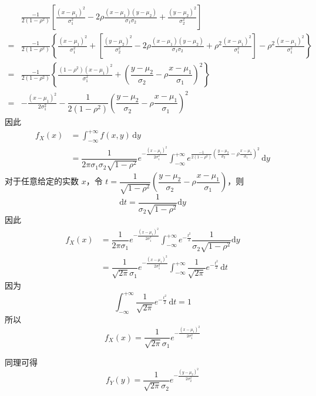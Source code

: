 \begin{myproof}
    $$
    \begin{aligned}
        & \frac{-1}{2(1-\rho^2)} \left[ \frac{(x-\mu_1)^2}{\sigma_1^2} - 2 \rho \frac{(x-\mu_1)(y-\mu_2)}{\sigma_1 \sigma_2} + \frac{(y-\mu_2)^2}{\sigma_2^2} \right] \\
        = & \frac{-1}{2(1-\rho^2)} \left\{ \frac{(x-\mu_1)^2}{\sigma_1^2} + \left[ \frac{(y-\mu_2)^2}{\sigma_2^2} - 2 \rho \frac{(x-\mu_1)(y-\mu_2)}{\sigma_1 \sigma_2} + \rho^2 \frac{(x-\mu_1)^2}{\sigma_1^2} \right] - \rho^2 \frac{(x-\mu_1)^2}{\sigma_1^2} \right\} \\
        = & \frac{-1}{2(1-\rho^2)} \left\{ \frac{(1-\rho^2)(x-\mu_1)^2}{\sigma_1^2} + \left( \dfrac{y-\mu_2}{\sigma_2} - \rho \dfrac{x-\mu_1}{\sigma_1} \right)^2 \right\} \\
        = & -\frac{(x-\mu_1)^2}{2\sigma_1^2} - \dfrac{1}{2(1-\rho^2)} \left( \dfrac{y-\mu_2}{\sigma_2} - \rho \dfrac{x-\mu_1}{\sigma_1} \right)^2
    \end{aligned}
    $$
    因此
    $$
    \begin{aligned}
        f_{X}(x) &= \int_{-\infty}^{+\infty} f(x,y) \, \text{d}y \\
        &= \dfrac{1}{2 \pi \sigma_1 \sigma_2 \sqrt{1-\rho^2}} e^{-\frac{(x-\mu_1)^2}{2 \sigma_1^2}} \int_{-\infty}^{+\infty} e^{\frac{-1}{2(1-\rho^2)} \left( \frac{y-\mu_2}{\sigma_2} - \rho \frac{x-\mu_1}{\sigma_1} \right)^2} \, \text{d}y
    \end{aligned}
    $$
    对于任意给定的实数 $x$，令 $t = \dfrac{1}{\sqrt{1-\rho^2}} \left( \dfrac{y-\mu_2}{\sigma_2} - \rho \dfrac{x-\mu_1}{\sigma_1} \right)$，则
    $$
    \text{d}t = \dfrac{1}{\sigma_2 \sqrt{1-\rho^2}} \text{d}y
    $$
    因此
    $$
    \begin{aligned}
        f_{X}(x) &= \dfrac{1}{2 \pi \sigma_1} e^{-\frac{(x-\mu_1)^2}{2 \sigma_1^2}} \int_{-\infty}^{+\infty} e^{-\frac{t^2}{2}} \dfrac{1}{\sigma_2 \sqrt{1-\rho^2}} \text{d}y \\
        &= \dfrac{1}{\sqrt{2\pi} \sigma_1} e^{-\frac{(x-\mu_1)^2}{2 \sigma_1^2}} \int_{-\infty}^{+\infty} \dfrac{1}{\sqrt{2\pi}} e^{-\frac{t^2}{2}} \, \text{d}t
    \end{aligned}
    $$
    因为
    $$
    \int_{-\infty}^{+\infty} \dfrac{1}{\sqrt{2\pi}} e^{-\frac{t^2}{2}} \, \text{d}t = 1
    $$
    所以
    $$
    f_{X}(x) = \dfrac{1}{\sqrt{2\pi} \sigma_1} e^{-\frac{(x-\mu_1)^2}{2 \sigma_1^2}}
    $$

    同理可得
    $$
    f_{Y}(y) = \dfrac{1}{\sqrt{2\pi} \sigma_2} e^{-\frac{(y-\mu_2)^2}{2 \sigma_2^2}}
    $$
\end{myproof}

